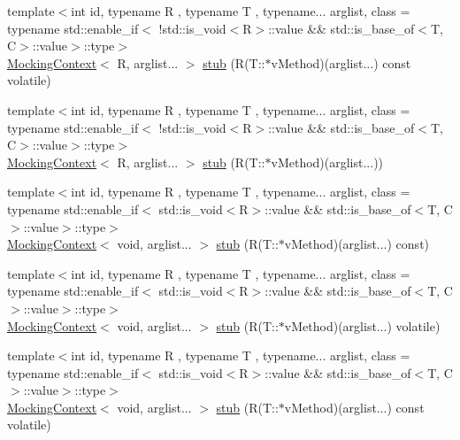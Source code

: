 \begin{DoxyCompactItemize}
\item 
{\footnotesize template$<$int id, typename R , typename T , typename... arglist, class  = typename std\+::enable\+\_\+if$<$                !std\+::is\+\_\+void$<$\+R$>$\+::value \&\& std\+::is\+\_\+base\+\_\+of$<$\+T, C$>$\+::value$>$\+::type$>$ }\\\mbox{\hyperlink{classfakeit_1_1MockingContext}{Mocking\+Context}}$<$ R, arglist... $>$ \mbox{\hyperlink{classfakeit_1_1Mock_a963fce628ddab338bc3ee984a137db31}{stub}} (R(T\+::$\ast$v\+Method)(arglist...) const volatile)
\item 
{\footnotesize template$<$int id, typename R , typename T , typename... arglist, class  = typename std\+::enable\+\_\+if$<$                !std\+::is\+\_\+void$<$\+R$>$\+::value \&\& std\+::is\+\_\+base\+\_\+of$<$\+T, C$>$\+::value$>$\+::type$>$ }\\\mbox{\hyperlink{classfakeit_1_1MockingContext}{Mocking\+Context}}$<$ R, arglist... $>$ \mbox{\hyperlink{classfakeit_1_1Mock_a69141994a924c71af3bf9cb4d5a998b6}{stub}} (R(T\+::$\ast$v\+Method)(arglist...))
\item 
{\footnotesize template$<$int id, typename R , typename T , typename... arglist, class  = typename std\+::enable\+\_\+if$<$                std\+::is\+\_\+void$<$\+R$>$\+::value \&\& std\+::is\+\_\+base\+\_\+of$<$\+T, C$>$\+::value$>$\+::type$>$ }\\\mbox{\hyperlink{classfakeit_1_1MockingContext}{Mocking\+Context}}$<$ void, arglist... $>$ \mbox{\hyperlink{classfakeit_1_1Mock_a1861b19f93de559fc183139f1ecdfa6b}{stub}} (R(T\+::$\ast$v\+Method)(arglist...) const)
\item 
{\footnotesize template$<$int id, typename R , typename T , typename... arglist, class  = typename std\+::enable\+\_\+if$<$                std\+::is\+\_\+void$<$\+R$>$\+::value \&\& std\+::is\+\_\+base\+\_\+of$<$\+T, C$>$\+::value$>$\+::type$>$ }\\\mbox{\hyperlink{classfakeit_1_1MockingContext}{Mocking\+Context}}$<$ void, arglist... $>$ \mbox{\hyperlink{classfakeit_1_1Mock_a8bb1a9ff231e91407f6dea872e2c4a4f}{stub}} (R(T\+::$\ast$v\+Method)(arglist...) volatile)
\item 
{\footnotesize template$<$int id, typename R , typename T , typename... arglist, class  = typename std\+::enable\+\_\+if$<$                std\+::is\+\_\+void$<$\+R$>$\+::value \&\& std\+::is\+\_\+base\+\_\+of$<$\+T, C$>$\+::value$>$\+::type$>$ }\\\mbox{\hyperlink{classfakeit_1_1MockingContext}{Mocking\+Context}}$<$ void, arglist... $>$ \mbox{\hyperlink{classfakeit_1_1Mock_a22b83b574e4db2689c8a1f3375554035}{stub}} (R(T\+::$\ast$v\+Method)(arglist...) const volatile)

\end{DoxyCompactItemize}

